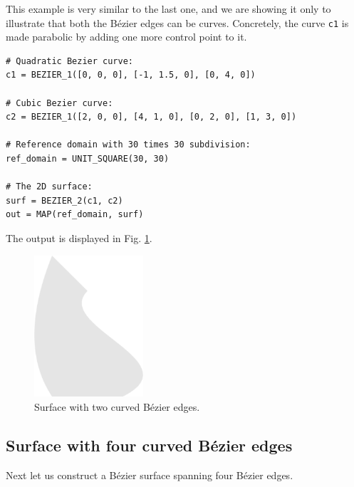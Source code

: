 This example is very similar to the last one, and we are showing it 
only to illustrate that both the B\'ezier edges can be curves. 
Concretely, the curve {\tt c1} is made parabolic by adding one 
more control point to it. \\

\begin{bbox}
\begin{verbatim}
# Quadratic Bezier curve:
c1 = BEZIER_1([0, 0, 0], [-1, 1.5, 0], [0, 4, 0])

# Cubic Bezier curve:
c2 = BEZIER_1([2, 0, 0], [4, 1, 0], [0, 2, 0], [1, 3, 0])

# Reference domain with 30 times 30 subdivision:
ref_domain = UNIT_SQUARE(30, 30)

# The 2D surface:
surf = BEZIER_2(c1, c2)
out = MAP(ref_domain, surf)
\end{verbatim}
\end{bbox}
\vspace{6mm}

\noindent
The output is displayed in Fig. \ref{fig:curves-2}.

\begin{figure}[!ht]
\begin{center}
\includegraphics[width=0.36\textwidth]{img/curves-2.png}
\end{center}
\vspace{-4mm}
\caption{Surface with two curved B\'ezier edges.}
\label{fig:curves-2}
\end{figure}

\subsection{Surface with four curved B\'ezier edges}

Next let us construct a B\'ezier surface spanning four 
B\'ezier edges. \\

